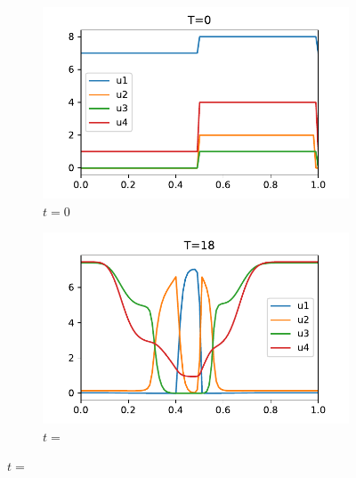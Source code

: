 \documentclass[a4paper]{scrartcl}
\numberwithin{equation}{section}
\theoremstyle{plain}
\theoremstyle{definition}
\numberwithin{theorem}{section}
\newcommand{\1}{\mathbbm{1}}
\begin{document}
\begin{figure}
    \centering
    \begin{subfigure}[b]{0.49\textwidth}
        \includegraphics[width=\textwidth]{plots/ADP_sol_00.pdf}
        \caption{$t=0$}
        \label{fig:sol_ADP00}
    \end{subfigure}
    \begin{subfigure}[b]{0.49\textwidth}
        \includegraphics[width=\textwidth]{plots/ADP_sol_18.pdf}
        \caption{$t=$}
        \label{fig:sol_ADP18}
    \end{subfigure}
    

\end{figure}
\end{document}
